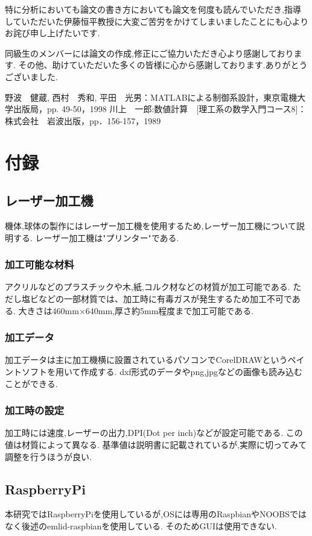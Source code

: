 \documentclass[12pt,oneside]{sotsuken_paper}
\begin{document}
特に分析においても論文の書き方においても論文を何度も読んでいただき,指導していただいた伊藤恒平教授に大変ご苦労をかけてしまいましたことにも心よりお詫び申し上げたいです.


同級生のメンバーには論文の作成,修正にご協力いただき心より感謝しております.
その他、助けていただいた多くの皆様に心から感謝しております.ありがとうございました.

\begin{thebibliography}{8}
	 野波　健蔵, 西村　秀和, 平田　光男：MATLABによる制御系設計，東京電機大学出版局，pp. 49-50，1998
	 川上　一郎:数値計算　[理工系の数学入門コース8]：株式会社　岩波出版，pp．156-157，1989
\end{thebibliography}

\chapter*{付録}

\section{レーザー加工機}
機体,球体の製作にはレーザー加工機を使用するため,レーザー加工機について説明する.
レーザー加工機は"プリンター"である.

\subsection{加工可能な材料}
アクリルなどのプラスチックや木,紙,コルク材などの材質が加工可能である.
ただし塩ビなどの一部材質では、加工時に有毒ガスが発生するため加工不可である.
大きさは460mm×640mm,厚さ約5mm程度まで加工可能である.

\subsection{加工データ}
加工データは主に加工機横に設置されているパソコンでCorelDRAWというペイントソフトを用いて作成する.
dxf形式のデータやpng,jpgなどの画像も読み込むことができる.

\subsection{加工時の設定}
加工時には速度,レーザーの出力,DPI(Dot per inch)などが設定可能である.
この値は材質によって異なる.
基準値は説明書に記載されているが,実際に切ってみて調整を行うほうが良い.

\section{RaspberryPi}
本研究ではRaspberryPiを使用しているが,OSには専用のRaspbianやNOOBSではなく後述のemlid-raspbianを使用している.
そのためGUIは使用できない.
\end{document}

